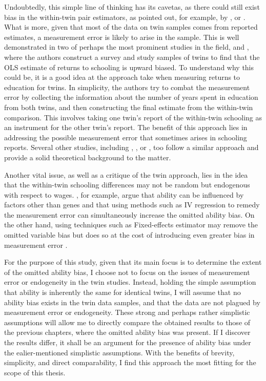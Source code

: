 Undoubtedly, this simple line of thinking has its cavetas, as there could still exist bias in the within-twin pair estimators, as pointed out, for example, by \cite{bound1999double}, or \cite{nakamuro2012estimating}. What is more, given that most of the data on twin samples comes from reported estimates, a measurement error is likely to arise in the sample. This is well demonstrated in two of perhaps the most prominent studies in the field, \cite{ashenfelter1994estimates} and \cite{ashenfelter1998income}, where the authors construct a survey and study samples of twins to find that the \ac{OLS} estimate of returns to schooling is upward biased. To understand why this could be, it is a good idea at the approach \cite{ashenfelter1994estimates} take when measuring returns to education for twins. In simplicity, the authors try to combat the measurement error by collecting the information about the number of years spent in education from both twins, and then constructing the final estimate from the within-twin comparison. This involves taking one twin's report of the within-twin schooling as an instrument for the other twin's report. The benefit of this approach lies in addressing the possible measurement error that sometimes arises in schooling reports. Several other studies, including \cite{behrman1994endowments}, \cite{isacsson1999estimates}, or \cite{bonjour2003returns}, too follow a similar approach and provide a solid theoretical background to the matter.

Another vital issue, as well as a critique of the twin approach, lies in the idea that the within-twin schooling differences may not be random but endogenous with respect to wages. \cite{bound1999double}, for example, argue that ability can be influenced by factors other than genes and that using methods such as \ac{IV} regression to remedy the measurement error can simultaneously increase the omitted ability bias. On the other hand, using techniques such as Fixed-effects estimator may remove the omitted variable bias but does so at the cost of introducing even greater bias in measurement error \citep{ning2005economic}.

For the purpose of this study, given that its main focus is to determine the extent of the omitted ability bias, I choose not to focus on the issues of measurement error or endogeneity in the twin studies. Instead, holding the simple assumption that ability is inherently the same for identical twins, I will assume that no ability bias exists in the twin data samples, and that the data are not plagued by measurement error or endogeneity. These strong and perhaps rather simplistic assumptions will allow me to directly compare the obtained results to those of the previous chapters, where the omitted ability bias was present. If I discover the results differ, it shall be an argument for the presence of ability bias under the ealier-mentioned simplistic assumptions. With the benefits of brevity, simplicity, and direct comparability, I find this approach the most fitting for the scope of this thesis.


